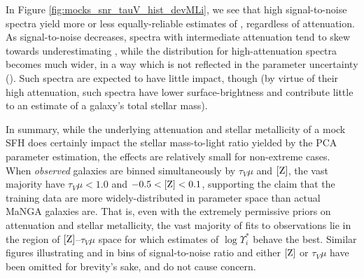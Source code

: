 In Figure \ref{fig:mocks_snr_tauV_hist_devMLi}, we see that high signal-to-noise spectra yield more or less equally-reliable estimates of , regardless of attenuation. As signal-to-noise decreases, spectra with intermediate attenuation tend to skew towards underestimating , while the distribution for high-attenuation spectra becomes much wider, in a way which is not reflected in the parameter uncertainty (). Such spectra are expected to have little impact, though (by virtue of their high attenuation, such spectra have lower surface-brightness and contribute little to an estimate of a galaxy's total stellar mass).

In summary, while the underlying attenuation and stellar metallicity of a mock SFH does certainly impact the stellar mass-to-light ratio yielded by the PCA parameter estimation, the effects are relatively small for non-extreme cases. When \ntestgalaxies \emph{observed} galaxies are binned simultaneously by $\tau_V \mu$ and ${\rm [Z]}$, the vast majority have $\tau_V \mu < 1.0$ and $-0.5 < {\rm[Z]} < 0.1$, supporting the claim that the training data are more widely-distributed in parameter space than actual MaNGA galaxies are. That is, even with the extremely permissive priors on attenuation and stellar metallicity, the vast majority of fits to observations lie in the region of ${\rm [Z]}$--$\tau_V \mu$ space for which estimates of $\log \Upsilon^*_i$ behave the best. Similar figures illustrating  and  in bins of signal-to-noise ratio and either ${\rm [Z]}$ or $\tau_V \mu$ have been omitted for brevity's sake, and do not cause concern.